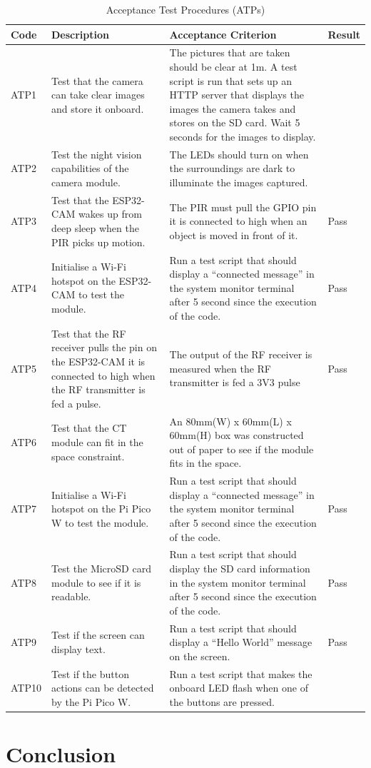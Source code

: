 \begin{table}[h]
\centering
\begin{tabular}{|p{1cm}|p{5cm}|p{7cm}|p{2cm}|}
\hline
\textbf{Code} & \textbf{Description} & \textbf{Acceptance Criterion} & \textbf{Result} \\
\hline
ATP1 & Test that the camera can take clear images and store it onboard. & The pictures that are taken should be clear at 1m. A test script is run that sets up an HTTP server that displays the images the camera takes and stores on the SD card. Wait 5 seconds for the images to display. &  \\
\hline
ATP2 & Test the night vision capabilities of the camera module. & The LEDs should turn on when the surroundings are dark to illuminate the images captured. &  \\
\hline
ATP3 & Test that the ESP32-CAM wakes up from deep sleep when the PIR picks up motion. & The PIR must pull the GPIO pin it is connected to high when an object is moved in front of it. & Pass \\
\hline
ATP4 & Initialise a Wi-Fi hotspot on the ESP32-CAM to test the module. & Run a test script that should display a “connected message” in the system monitor terminal after 5 second since the execution of the code. & Pass \\
\hline
ATP5 & Test that the RF receiver pulls the pin on the ESP32-CAM it is connected to high when the RF transmitter is fed a pulse. & The output of the RF receiver is measured when the RF transmitter is fed a 3V3 pulse & Pass \\
\hline
ATP6 & Test that the CT module can fit in the space constraint. & An 80mm(W) x 60mm(L) x 60mm(H) box was constructed out of paper to see if the module fits in the space. &  \\
\hline
ATP7 & Initialise a Wi-Fi hotspot on the Pi Pico W to test the module. & Run a test script that should display a “connected message” in the system monitor terminal after 5 second since the execution of the code. & Pass \\
\hline
ATP8 & Test the MicroSD card module to see if it is readable. & Run a test script that should display the SD card information in the system monitor terminal after 5 second since the execution of the code. & Pass \\
\hline
ATP9 & Test if the screen can display text. & Run a test script that should display a “Hello World” message on the screen. & Pass \\
\hline
ATP10 & Test if the button actions can be detected by the Pi Pico W. & Run a test script that makes the onboard LED flash when one of the buttons are pressed. &  \\
\hline
\end{tabular}
\caption{Acceptance Test Procedures (ATPs)}
\label{tab:ATPs}
\end{table}



\section{Conclusion}


\ifstandalone

\printnoidxglossary[type=\acronymtype,nonumberlist]
\fi

